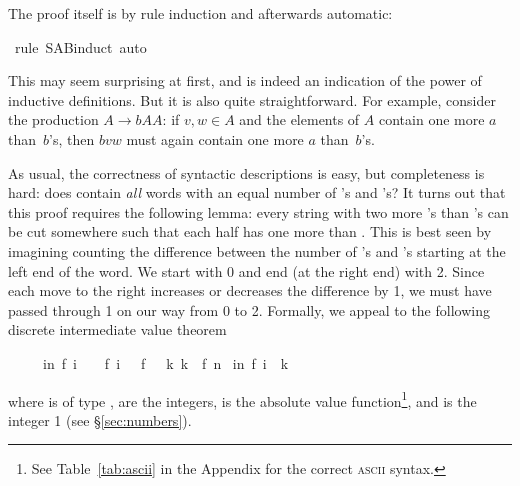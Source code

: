 \begin{isabellebody}
\begin{isamarkuptxt}
The proof itself is by rule induction and afterwards automatic:%
\end{isamarkuptxt}%
\isamarkuptrue%
\isamarkupfalse%
\ {\isacharparenleft}rule\ S{\isacharunderscore}A{\isacharunderscore}B{\isachardot}induct{\isacharcomma}\ auto{\isacharparenright}%
\endisatagproof
{\isafoldproof}%
%
\isadelimproof
%
\endisadelimproof
%
\begin{isamarkuptext}%
\noindent
This may seem surprising at first, and is indeed an indication of the power
of inductive definitions. But it is also quite straightforward. For example,
consider the production $A \to b A A$: if $v,w \in A$ and the elements of $A$
contain one more $a$ than~$b$'s, then $bvw$ must again contain one more $a$
than~$b$'s.

As usual, the correctness of syntactic descriptions is easy, but completeness
is hard: does  contain \emph{all} words with an equal number of
's and 's? It turns out that this proof requires the
following lemma: every string with two more 's than 's can be cut somewhere such that each half has one more  than
. This is best seen by imagining counting the difference between the
number of 's and 's starting at the left end of the
word. We start with 0 and end (at the right end) with 2. Since each move to the
right increases or decreases the difference by 1, we must have passed through
1 on our way from 0 to 2. Formally, we appeal to the following discrete
intermediate value theorem 
\begin{isabelle}%
\ \ \ \ \ {\isasymlbrakk}{\isasymforall}i{\isacharless}n{\isachardot}\ {\isasymbar}f\ {\isacharparenleft}i\ {\isacharplus}\ {}{\isacharparenright}\ {\isacharminus}\ f\ i{\isasymbar}\ {\isasymle}\ {}{\isacharsemicolon}\ f\ {}\ {\isasymle}\ k{\isacharsemicolon}\ k\ {\isasymle}\ f\ n{\isasymrbrakk}\isanewline
\isaindent{\ \ \ \ \ }{\isasymLongrightarrow}\ {\isasymexists}i{\isasymle}n{\isachardot}\ f\ i\ {\isacharequal}\ k%
\end{isabelle}
where  is of type ,  are the integers,
\isa{{\isasymbar}{\isachardot}{\isasymbar}} is the absolute value function\footnote{See
Table~\ref{tab:ascii} in the Appendix for the correct \textsc{ascii}
syntax.}, and  is the integer 1 (see \S\ref{sec:numbers}).


\end{isamarkuptext}
\end{isabellebody}
